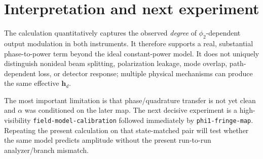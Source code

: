 \documentclass[10pt]{article}
\begin{document}
\section{Interpretation and next experiment}
The calculation quantitatively captures the observed \emph{degree} of
$\phi_2$-dependent output modulation in both instruments. It therefore
supports a real, substantial phase-to-power term beyond the ideal
constant-power model. It does not uniquely distinguish nonideal beam splitting,
polarization leakage, mode overlap, path-dependent loss, or detector response;
multiple physical mechanisms can produce the same effective $\mathbf{h}_d$.

The most important limitation is that phase/quadrature transfer is not yet
clean and $\alpha$ was conditioned on the later map. The next decisive
experiment is a high-visibility \texttt{field-model-calibration} followed
immediately by \texttt{phi1-fringe-map}. Repeating the present calculation on
that state-matched pair will test whether the same model predicts amplitude
without the present run-to-run analyzer/branch mismatch.
\end{document}
